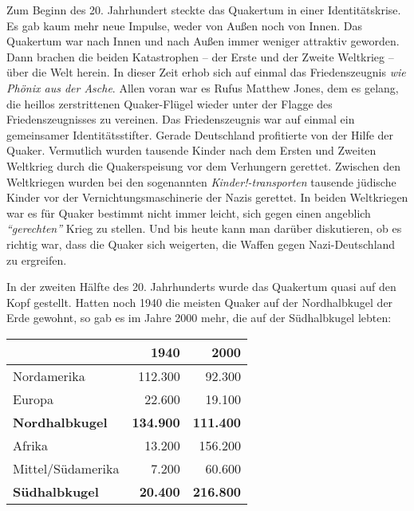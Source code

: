 Zum Beginn des 20. Jahrhundert steckte das Quakertum in einer Identitätskrise.
Es gab kaum mehr neue Impulse, weder von Außen
noch von Innen. Das Quakertum war
nach Innen und nach Außen immer weniger attraktiv geworden. Dann brachen die
beiden Katastrophen -- der Erste und der Zweite Weltkrieg --
über die Welt
herein. In dieser Zeit erhob sich auf einmal das Friedenszeugnis
\textit{wie
Phönix aus der Asche}. Allen voran war es Rufus Matthew Jones,
 dem
es gelang, die heillos zerstrittenen Quaker-Flügel wieder unter der Flagge des
Friedenszeugnisses zu vereinen. Das Friedenszeugnis war auf einmal ein
gemeinsamer Identitätsstifter. Gerade Deutschland
 profitierte von der Hilfe der
Quaker. Vermutlich wurden tausende Kinder nach dem Ersten und Zweiten Weltkrieg
durch die Quakerspeisung  vor dem Verhungern gerettet.
Zwischen den Weltkriegen
wurden bei den sogenannten \textit{Kinder!-transporten}
tausende jüdische Kinder 
vor der Vernichtungsmaschinerie der Nazis gerettet. In beiden Weltkriegen war es
für Quaker bestimmt nicht immer leicht, sich gegen einen
angeblich \textit{"`gerechten"'}
Krieg zu stellen. Und bis heute kann man darüber diskutieren, ob es richtig
war, dass die Quaker sich weigerten, die Waffen gegen Nazi-Deutschland zu
ergreifen.

\medskip

In der zweiten Hälfte des 20. Jahrhunderts wurde das Quakertum quasi auf den
Kopf
gestellt. Hatten noch 1940 die meisten Quaker auf der Nordhalbkugel der Erde
gewohnt, so gab es im Jahre 2000 mehr, die auf der Südhalbkugel lebten:

\begin{center}
\begin{tabular}{|l|r|r|} \hline
                        & \textbf{1940}        & \textbf{2000}    \\ \hline
\hline
Nordamerika             & 112.300              & 92.300           \\ \hline
Europa                  & 22.600               & 19.100           \\ \hline
\textbf{Nordhalbkugel}  & \textbf{134.900}     & \textbf{111.400} \\ \hline
Afrika                  & 13.200               & 156.200          \\ \hline
Mittel/Südamerika       & 7.200                & 60.600           \\ \hline
\textbf{Südhalbkugel}   & \textbf{20.400}      & \textbf{216.800} \\ \hline
\end{tabular}
\end{center}


